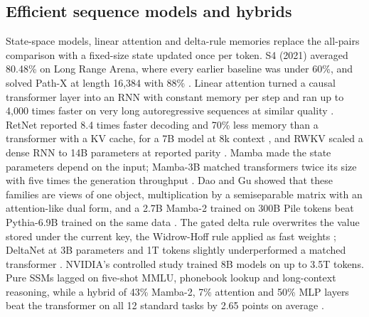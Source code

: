 \subsection{Efficient sequence models and hybrids}
State-space models, linear attention and delta-rule memories replace the all-pairs comparison with a fixed-size state updated once per token. S4 (2021) averaged 80.48\% on Long Range Arena, where every earlier baseline was under 60\%, and solved Path-X at length 16,384 with 88\% \cite{post1}. Linear attention turned a causal transformer layer into an RNN with constant memory per step and ran up to 4,000 times faster on very long autoregressive sequences at similar quality \cite{post4}. RetNet reported 8.4 times faster decoding and 70\% less memory than a transformer with a KV cache, for a 7B model at 8k context \cite{post5}, and RWKV scaled a dense RNN to 14B parameters at reported parity \cite{post6}. Mamba made the state parameters depend on the input; Mamba-3B matched transformers twice its size with five times the generation throughput \cite{post2}. Dao and Gu showed that these families are views of one object, multiplication by a semiseparable matrix with an attention-like dual form, and a 2.7B Mamba-2 trained on 300B Pile tokens beat Pythia-6.9B trained on the same data \cite{post3}. The gated delta rule overwrites the value stored under the current key, the Widrow-Hoff rule applied as fast weights \cite{post8}; DeltaNet at 3B parameters and 1T tokens slightly underperformed a matched transformer \cite{post7}. NVIDIA's controlled study trained 8B models on up to 3.5T tokens. Pure SSMs lagged on five-shot MMLU, phonebook lookup and long-context reasoning, while a hybrid of 43\% Mamba-2, 7\% attention and 50\% MLP layers beat the transformer on all 12 standard tasks by 2.65 points on average \cite{post17}.

